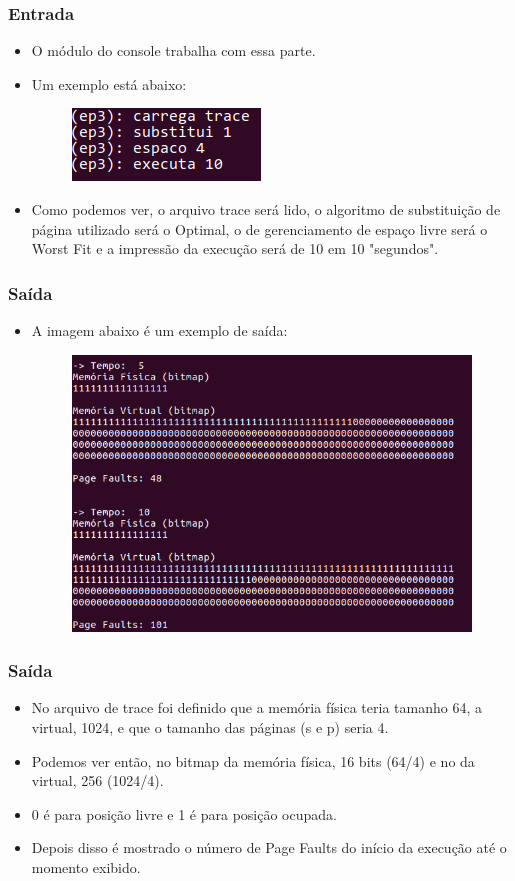 \documentclass{beamer}
\begin{document}
\begin{frame}
	\frametitle{Entrada}
	\begin{itemize}
		\item O módulo do console trabalha com essa parte.
		\item Um exemplo está abaixo:
		\begin{figure}[!h]
			\centering
			\includegraphics[scale=0.75]{a.png}
		\end{figure}
		\item Como podemos ver, o arquivo trace será lido, o algoritmo de substituição de página utilizado será o Optimal, o de gerenciamento de espaço livre será o Worst Fit e a impressão da execução será de 10 em 10 "segundos".
	\end{itemize}
\end{frame}

\begin{frame}
	\frametitle{Saída}
	\begin{itemize}
		\item A imagem abaixo é um exemplo de saída:
		\begin{figure}[!h]
			\centering
			\includegraphics[scale=0.4]{b.png}
		\end{figure}		
	\end{itemize}
\end{frame}

\begin{frame}
	\frametitle{Saída}
	\begin{itemize}
		\item No arquivo de trace foi definido que a memória física teria tamanho 64, a virtual, 1024, e que o tamanho das páginas (s e p) seria 4.
		\item Podemos ver então, no bitmap da memória física, 16 bits (64/4) e no da virtual, 256 (1024/4).
		\item 0 é para posição livre e 1 é para posição ocupada.
		\item Depois disso é mostrado o número de Page Faults do início da execução até o momento exibido.
	\end{itemize}
\end{frame}
\end{document}
